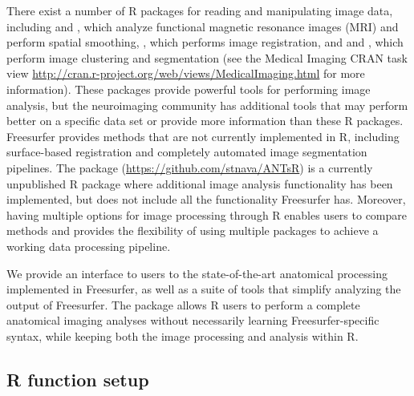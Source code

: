 There exist a number of R packages for reading and manipulating image
data, including  \citep{bordier_temporal_2011} and
 \citep{tabelow_statistical_2011}, which analyze
functional magnetic resonance images (MRI) and perform spatial
smoothing,  \citep{modat_rniftyreg:_2013}, which
performs image registration, and  \citep{dpmixsim} and
 \citep{mritc}, which perform image clustering and
segmentation (see the Medical Imaging CRAN task view
\url{http://cran.r-project.org/web/views/MedicalImaging.html} for more
information). These packages provide powerful tools for performing image
analysis, but the neuroimaging community has additional tools that may
perform better on a specific data set or provide more information than
these R packages. Freesurfer provides methods that are not currently
implemented in R, including surface-based registration and completely
automated image segmentation pipelines. The  package
(\url{https://github.com/stnava/ANTsR}) is a currently unpublished R
package where additional image analysis functionality has been
implemented, but does not include all the functionality Freesurfer has.
Moreover, having multiple options for image processing through R enables
users to compare methods and provides the flexibility of using multiple
packages to achieve a working data processing pipeline.

We provide an interface to users to the state-of-the-art anatomical
processing implemented in Freesurfer, as well as a suite of tools that
simplify analyzing the output of Freesurfer. The 
package allows R users to perform a complete anatomical imaging analyses
without necessarily learning Freesurfer-specific syntax, while keeping
both the image processing and analysis within R.

\subsection{R function setup}\label{r-function-setup}

